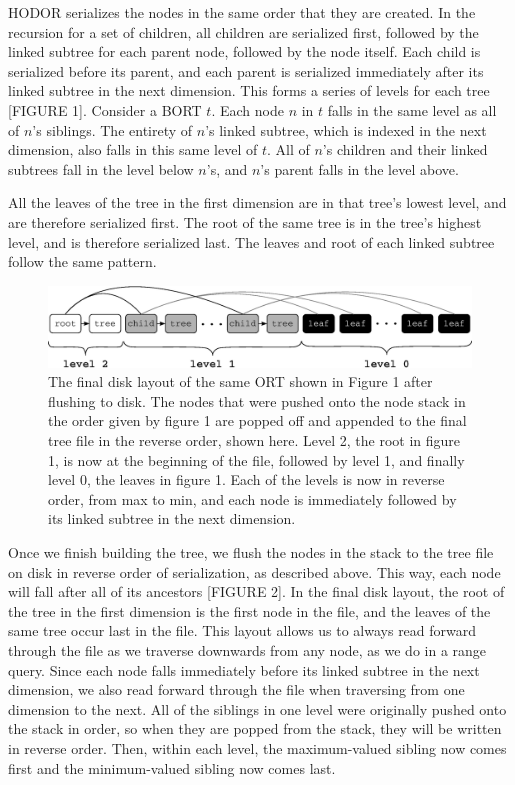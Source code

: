 \documentclass[11pt, oneside]{article}
\begin{document}
HODOR serializes the nodes in the same order that they are created. In the
recursion for a set of children, all children are serialized first, followed by
the linked subtree for each parent node, followed by the node itself. Each
child is serialized before its parent, and each parent is serialized
immediately after its linked subtree in the next dimension. This forms a series
of levels \cite{seinfeld} for each tree [FIGURE 1]. Consider a BORT $t$. Each
node $n$ in $t$ falls in the same level as all of $n$'s siblings. The entirety
of $n$'s linked subtree, which is indexed in the next dimension, also falls in
this same level of $t$. All of $n$'s children and their linked subtrees fall in
the level below $n$'s, and $n$'s parent falls in the level above. 

All the leaves of the tree in the first dimension are in that tree's lowest
level, and are therefore serialized first. The root of the same tree is in the
tree's highest level, and is therefore serialized last. The leaves and root of
each linked subtree follow the same pattern. 

\begin{figure}[h!]
    \centering
    \includegraphics[width=1\textwidth]{fig2.eps}
    \caption{
        The final disk layout of the same ORT shown in Figure 1 after flushing
        to disk. The nodes that were pushed onto the node stack in the order
        given by figure 1 are popped off and appended to the final tree file in
        the reverse order, shown here. Level 2, the root in figure 1, is now at
        the beginning of the file, followed by level 1, and finally level 0,
        the leaves in figure 1. Each of the levels is now in reverse order,
        from max to min, and each node is immediately followed by its linked
        subtree in the next dimension. 
    }
    \vspace{0.5in}
\end{figure}

Once we finish building the tree, we flush the nodes in the stack to the tree file on disk
in reverse order of serialization, as described above. This way, each node will
fall after all of its ancestors [FIGURE 2]. In the final disk layout, the root
of the tree in the first dimension is the first node in the file, and the leaves
of the same tree occur last in the file. This layout allows us to always read
forward through the file as we traverse downwards from any node, as we do in a
range query. Since each node falls immediately before its linked subtree in the
next dimension, we also read forward through the file when traversing from one
dimension to the next. All of the siblings in one level were originally pushed
onto the stack in order, so when they are popped from the stack, they will be
written in reverse order. Then, within each level, the maximum-valued sibling
now comes first and the minimum-valued sibling now comes last. 
\end{document}
